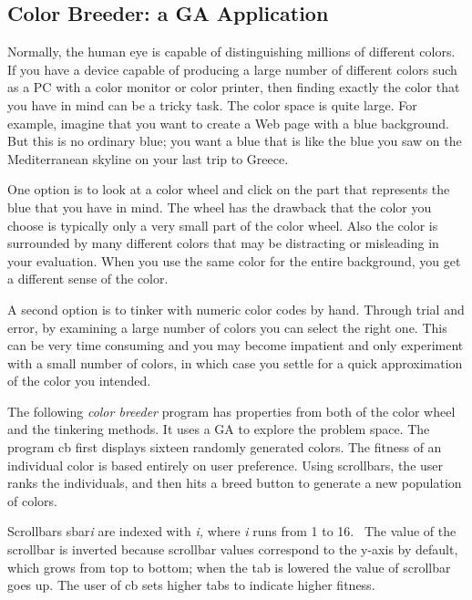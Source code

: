 \subsection{Color Breeder: a GA Application}

Normally, the human eye is capable of distinguishing millions of
different colors. If you have a device capable of producing a large
number of different colors such as a PC with a color monitor or color
printer, then finding exactly the color that you have in mind can be a
tricky task. The color space is quite large. For example, imagine that
you want to create a Web page with a blue background. But this is no
ordinary blue; you want a blue that is like the blue you saw on the
Mediterranean skyline on your last trip to Greece. \ 

One option is to look at a color wheel and click on the part that
represents the blue that you have in mind. The wheel has the drawback
that the color you choose is typically only a very small part of the
color wheel. Also the color is surrounded by many different colors that
may be distracting or misleading in your evaluation. When you use the
same color for the entire background, you get a different sense of the
color. 

A second option is to tinker with numeric color codes by hand. Through
trial and error, by examining a large number of colors you can select
the right one. This can be very time consuming and you may become
impatient and only experiment with a small number of colors, in which
case you settle for a quick approximation of the color you intended.

The following \textit{color breeder} program has properties from both of
the color wheel and the tinkering methods. It uses a GA to explore the
problem space. The program \textsf{cb} first displays sixteen randomly
generated colors. The fitness of an individual color is based entirely
on user preference. Using scrollbars, the user ranks the individuals,
and then hits a breed button to generate a new population of colors. 

Scrollbars \textsf{sbar}\textsf{\textit{i}} are indexed with
\textsf{\textit{i}}\textit{,} where \textsf{\textit{i}} runs from 1 to
16. \ The value of the scrollbar is inverted because scrollbar values
correspond to the y-axis by default, which grows from top to bottom;
when the tab is lowered the value of scrollbar goes up. The user of
\textsf{cb} sets higher tabs to indicate higher fitness.


